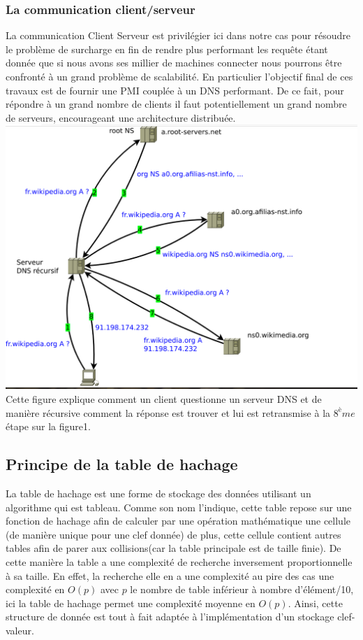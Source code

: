 \documentclass[12pt,a4paper]{article}
\begin{document}
\subsubsection{La communication client/serveur}

La communication Client Serveur est privilégier ici dans notre cas pour résoudre le problème de surcharge en fin de rendre plus performant les requête étant donnée que si nous avons ses millier de machines connecter nous pourrons être confronté à un grand problème de scalabilité. En particulier l'objectif final de ces travaux est de fournir une PMI couplée à un DNS performant. De ce fait, pour répondre à un grand nombre de clients il faut potentiellement un grand nombre de serveurs, encourageant une architecture distribuée.\\
\includegraphics[scale = 0.4]{figures/wiki.png}
Cette figure explique comment un client questionne un serveur DNS et de manière récursive comment la réponse est trouver et lui est retransmise à la $8^ème$ étape sur la figure1.\\
\subsection{Principe de la table de hachage}
\quad La table de hachage est une forme de stockage des données utilisant un algorithme qui est tableau. Comme son nom l'indique, cette table repose sur une fonction de hachage afin de calculer par une opération mathématique une cellule (de manière unique pour une clef donnée) de plus, cette cellule contient autres tables afin de parer aux collisions(car la table principale est de taille finie). De cette manière la table a une complexité de recherche inversement proportionnelle à sa taille. En effet, la recherche elle en a une complexité au pire des cas une complexité en $O(p)$ avec $p$ le nombre de table inférieur à nombre d'élément/10, ici la table de hachage permet une complexité moyenne en $O(p)$. Ainsi, cette structure de donnée est tout à fait adaptée à l'implémentation d'un stockage clef-valeur.
\end{document}
